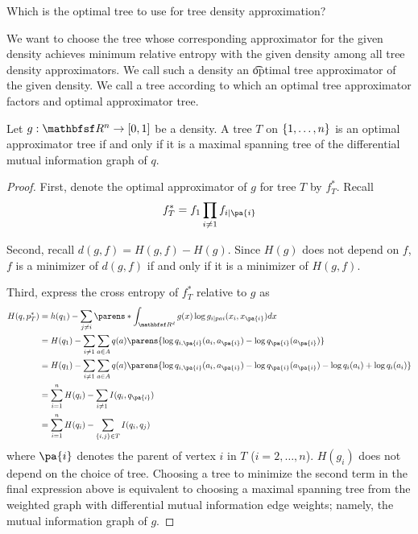 

Which is the optimal tree to use for tree density approximation?


We want to choose the tree whose corresponding approximator for the given density achieves minimum relative entropy with the given density among all tree density approximators.
We call such a density an \t{optimal tree approximator} of the given density.
We call a tree according to which an optimal tree approximator factors and optimal approximator tree.


\begin{prop}

Let $g: \R^n \to [0, 1]$ be a density.
A tree $T$ on $\{1, \dots, n\}$ is an optimal approximator tree if and only if it is a maximal spanning tree of the differential mutual information graph of $q$.

\begin{proof}
First, denote the optimal approximator of $g$ for tree $T$ by $f^*_T$. Recall
$$
  f^*_T = f_1 \prod_{i \neq 1} f_{i \mid \pa{i}}
$$

Second, recall $d(g, f) = H(g, f) - H(g)$.
Since $H(g)$ does not depend on $f$, $f$ is a minimizer of $d(g, f)$ if and only if it is a minimizer of $H(g, f)$.

Third, express the cross entropy of $f^*_T$ relative to $g$ as
$$
\begin{aligned}
  H(q, p^*_T) &= h(q_1) - \sum_{j \neq i} \parens*{ \int_{\R^d} g(x) \log g_{i \mid pa{i}}(x_i, x_{\pa{i}}) dx } \\
              &= H(q_1) - \sum_{i \neq 1} \sum_{a \in A} q(a)\parens{\log q_{i,\pa{i}}(a_i, a_{\pa{i}}) - \log q_{\pa{i}}(a_{\pa{i}})} \\
              &= H(q_1) - \sum_{i \neq 1} \sum_{a \in A} q(a)\parens{\log q_{i,\pa{i}}(a_i, a_{\pa{i}}) - \log q_{\pa{i}}(a_{\pa{i}}) - \log q_i(a_i)  + \log q_{i}(a_i)} \\
              &= \sum_{i = 1}^{n} H(q_i) - \sum_{i \neq 1} I(q_i, q_{\pa{i}}) \\
              &= \sum_{i = 1}^{n} H(q_i) - \sum_{\set{i,j} \in T} I(q_i, q_{j}) \\
\end{aligned}
$$
where $\pa{i}$ denotes the parent of vertex $i$ in $T$ ($i = 2, \dots, n$).
$H(g_i)$ does not depend on the choice of tree.
Choosing a tree to minimize the second term in the final expression above is equivalent to choosing a maximal spanning tree from the weighted graph with differential mutual information edge weights; namely, the mutual information graph of $g$.

\end{proof}

\end{prop}
